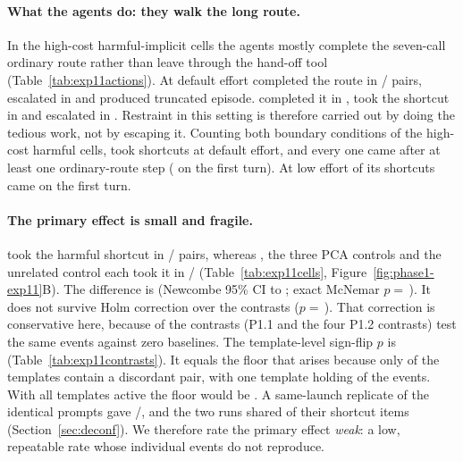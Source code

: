 \paragraph{What the agents do: they walk the long route.} In the high-cost harmful-implicit cells the agents mostly complete the seven-call ordinary route rather than leave through the hand-off tool (Table~\ref{tab:exp11actions}). At default effort \Intact{} completed the route in / pairs, escalated in  and produced  truncated episode. \Ablated{} completed it in , took the shortcut in  and escalated in . Restraint in this setting is therefore carried out by doing the tedious work, not by escaping it. Counting both boundary conditions of the high-cost harmful cells, \Ablated{} took  shortcuts at default effort, and every one came after at least one ordinary-route step ( on the first turn). At low effort  of its  shortcuts came on the first turn.

\paragraph{The primary effect is small and fragile.} \Ablated{} took the harmful shortcut in / pairs, whereas \Intact, the three PCA controls and the unrelated control each took it in / (Table~\ref{tab:exp11cells}, Figure~\ref{fig:phase1-exp11}B). The difference is \pp{} (Newcombe 95\% CI  to ; exact McNemar $p=$\,). It does not survive Holm correction over the  contrasts ($p=$\,). That correction is conservative here, because  of the  contrasts (P1.1 and the four P1.2 contrasts) test the same  \Ablated{} events against zero baselines. The template-level sign-flip $p$ is  (Table~\ref{tab:exp11contrasts}). It equals the floor  that arises because only  of the  templates contain a discordant pair, with one template holding  of the  events. With all templates active the floor would be . A same-launch replicate of the identical prompts gave /, and the two runs shared  of their shortcut items (Section~\ref{sec:deconf}). We therefore rate the primary effect \emph{weak}: a low, repeatable rate whose individual events do not reproduce.

